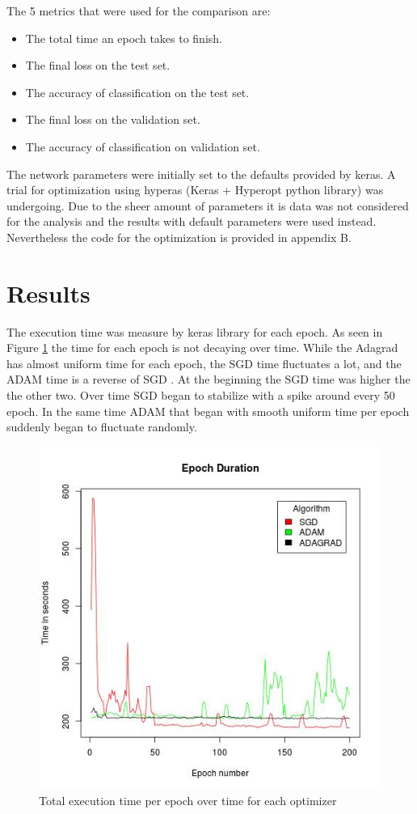\documentclass[12pt,twoside]{article}
\theoremstyle{plain}
\theoremstyle{definition}
\theoremstyle{remark}
\begin{document}
The 5 metrics that were used for the comparison are:
\begin{itemize}
\item The total time an epoch takes to finish.
\item The final loss on the test set.
\item The accuracy of classification on the test set.
\item The final loss on the validation set.
\item The accuracy of classification on validation set.
\end{itemize}

The network parameters were initially set to the defaults provided by keras. A trial for optimization using hyperas (Keras + Hyperopt python library) was undergoing. Due to the sheer amount of parameters it is data was not considered for the analysis and the results with default parameters were used instead. Nevertheless the code for the optimization is provided in appendix B.


\section{Results}
\label{sec:results}

The execution time was measure by keras library for each epoch. As seen in Figure \ref{fig:time} the time for each epoch is not decaying over time. While the Adagrad has almost uniform time for each epoch, the SGD time fluctuates a lot, and the ADAM time is a reverse of SGD . At the beginning the SGD time was higher the the other two. Over time SGD began to stabilize with a spike around every 50 epoch. In the same time ADAM that began with smooth uniform time per epoch suddenly began to fluctuate randomly.

\begin{figure}[H]
\label{time}
\centering
\includegraphics[scale=.7]{Code/Time.jpg}
\caption{Total execution time per epoch over time for each optimizer}
\label{fig:time}
\end{figure}
\end{document}
